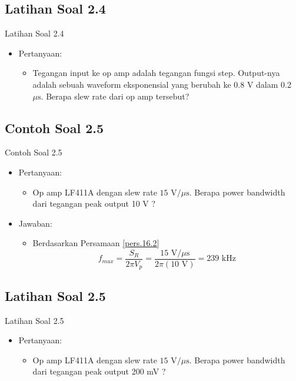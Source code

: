 \subsection{Latihan Soal 2.4}
\begin{frame}{Latihan Soal 2.4}
	\begin{itemize}
		\item Pertanyaan:
		\begin{itemize}
			\item Tegangan input ke op amp adalah tegangan fungsi step. Output-nya adalah sebuah waveform eksponensial yang berubah ke 0.8 V dalam 0.2 $ \mu \text{s} $. Berapa slew rate dari op amp tersebut?
		\end{itemize}
	\end{itemize}
\end{frame}

\subsection{Contoh Soal 2.5}
\begin{frame}{Contoh Soal 2.5}
	\begin{itemize}
		\item Pertanyaan:
		\begin{itemize}
			\item Op amp LF411A dengan slew rate $ 	15 \text{ V/}\mu \text{s} $. Berapa power bandwidth dari tegangan peak output 10 V ?
		\end{itemize}
		\item Jawaban:
		\begin{itemize}
			\item Berdasarkan Persamaan \ref{pers.16.2}
			\[ f_{max} = \frac{S_R}{2 \pi V_p} = \frac{15 \text{ V/}\mu \text{s}}{2 \pi (10 \text{ V}) } = 239 \text{ kHz}\] 
		\end{itemize}
	\end{itemize}
\end{frame}

\subsection{Latihan Soal 2.5}
\begin{frame}{Latihan Soal 2.5}
	\begin{itemize}
		\item Pertanyaan:
		\begin{itemize}
			\item Op amp LF411A dengan slew rate $ 	15 \text{ V/}\mu \text{s} $. Berapa power bandwidth dari tegangan peak output 200 mV ?
		\end{itemize}
	\end{itemize}
\end{frame}

